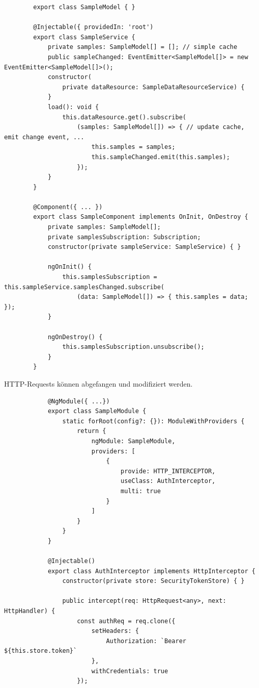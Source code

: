 \documentclass[10pt,landscape]{article}
\begin{document}
\begin{multicols}{3}
        \begin{lstlisting}
        export class SampleModel { }

        @Injectable({ providedIn: 'root')
        export class SampleService {
            private samples: SampleModel[] = []; // simple cache
            public sampleChanged: EventEmitter<SampleModel[]> = new EventEmitter<SampleModel[]>();
            constructor(
                private dataResource: SampleDataResourceService) {
            }
            load(): void {
                this.dataResource.get().subscribe(
                    (samples: SampleModel[]) => { // update cache, emit change event, ...
                        this.samples = samples;
                        this.sampleChanged.emit(this.samples);
                    });
            }
        }

        @Component({ ... })
        export class SampleComponent implements OnInit, OnDestroy {
            private samples: SampleModel[];
            private samplesSubscription: Subscription;
            constructor(private sampleService: SampleService) { }

            ngOnInit() {
                this.samplesSubscription = this.sampleService.samplesChanged.subscribe(
                    (data: SampleModel[]) => { this.samples = data; });
            }

            ngOnDestroy() {
                this.samplesSubscription.unsubscribe();
            }
        }
        \end{lstlisting}

        HTTP-Requests können abgefangen und modifiziert werden.

        \begin{lstlisting}
            @NgModule({ ...})
            export class SampleModule {
                static forRoot(config?: {}): ModuleWithProviders {
                    return {
                        ngModule: SampleModule,
                        providers: [
                            {
                                provide: HTTP_INTERCEPTOR,
                                useClass: AuthInterceptor,
                                multi: true
                            }
                        ]
                    }
                }
            }

            @Injectable()
            export class AuthInterceptor implements HttpInterceptor {
                constructor(private store: SecurityTokenStore) { }

                public intercept(req: HttpRequest<any>, next: HttpHandler) {
                    const authReq = req.clone({
                        setHeaders: {
                            Authorization: `Bearer ${this.store.token}`
                        },
                        withCredentials: true
                    });


\end{lstlisting}
\end{multicols}
\end{document}

